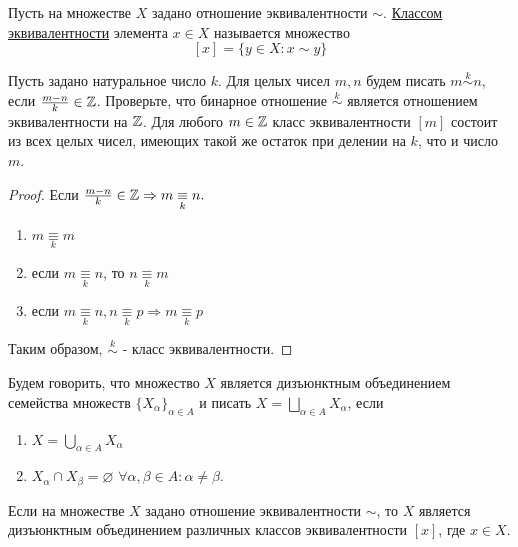 	\begin{definition}
		Пусть на множестве $X$ задано отношение эквивалентности $\sim$. \underline{Классом эквивалентности} элемента $x \in X$ называется множество
		\[ [x] = \{y \in X : x \sim y\} \]
	\end{definition}
	
	\begin{example}
		Пусть задано натуральное число $k$. Для целых чисел $m, n$ будем писать $m \overset{k}{\sim} n$, если $\frac{m - n}{k} \in \mathbb Z$. Проверьте, что бинарное отношение $\overset{k}{\sim}$ является отношением эквивалентности на $\mathbb Z$. Для любого $m \in \mathbb Z$ класс эквивалентности $[m]$ состоит из всех целых чисел, имеющих такой же остаток при делении на $k$, что и число $m$.
	\end{example}
	
	\begin{proof}
		Если $\frac{m - n}{k} \in \mathbb Z \Rightarrow m \underset{k}{\equiv} n.$
		\begin{enumerate}
			\item $m \underset{k}{\equiv} m$
			\item если $m \underset{k}{\equiv} n$, то $n \underset{k}{\equiv} m$
			\item если $m \underset{k}{\equiv} n, n \underset{k}{\equiv} p \Rightarrow m \underset{k}{\equiv} p$ 
		\end{enumerate}
		Таким образом, $\overset{k}{\sim}$ - класс эквивалентности.
	\end{proof}
	
	\begin{definition}
		Будем говорить, что множество $X$ является дизъюнктным объединением семейства множеств $\{X_{\alpha}\}_{\alpha \in A}$ и писать $X = \underset{\alpha \in A}{\bigsqcup} X_{\alpha}$, если
		\begin{enumerate}
			\item $X = \underset{\alpha \in A}{\bigcup} X_{\alpha}$
			\item $X_{\alpha} \cap X_{\beta} = \varnothing$ $\forall \alpha, \beta \in A : \alpha \neq \beta.$
		\end{enumerate}
	\end{definition}
	
	\begin{lemma}
		Если на множестве $X$ задано отношение эквивалентности $\sim$, то $X$ является дизъюнктным объединением различных классов эквивалентности $[x]$, где $x \in X$.
	\end{lemma}
	
